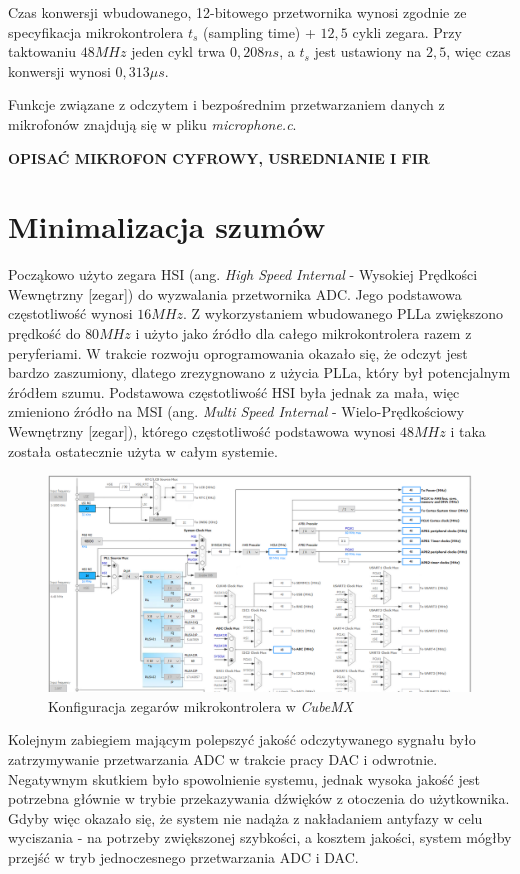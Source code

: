 Czas konwersji wbudowanego, 12-bitowego przetwornika wynosi zgodnie ze specyfikacja mikrokontrolera $t_s$ (sampling time) + $12,5$ cykli zegara\cite{STM32L4}. Przy taktowaniu $48MHz$ jeden cykl trwa $0,208ns$, a $t_s$ jest ustawiony na $2,5$, więc czas konwersji wynosi $0,313 \mu s$.

Funkcje związane z odczytem i bezpośrednim przetwarzaniem danych z mikrofonów znajdują się w pliku \textit{microphone.c}.

\textbf{OPISAĆ MIKROFON CYFROWY, USREDNIANIE I FIR}


\section{Minimalizacja szumów}
\label{cha:soft_noise}

Począkowo użyto zegara HSI (ang. \textit{High Speed Internal} - Wysokiej Prędkości Wewnętrzny [zegar]) do wyzwalania przetwornika ADC. Jego podstawowa częstotliwość wynosi $16MHz$. Z wykorzystaniem wbudowanego PLLa zwiększono prędkość do $80MHz$ i użyto jako źródło dla całego mikrokontrolera razem z peryferiami. W trakcie rozwoju oprogramowania okazało się, że odczyt jest bardzo zaszumiony, dlatego zrezygnowano z użycia PLLa, który był potencjalnym źródłem szumu. Podstawowa częstotliwość HSI była jednak za mała, więc zmieniono źródło na MSI (ang. \textit{Multi Speed Internal} - Wielo-Prędkościowy Wewnętrzny [zegar]), którego częstotliwość podstawowa wynosi $48MHz$ i taka została ostatecznie użyta w całym systemie.

\begin{figure}[H]
	\centering
	\includegraphics[scale=0.4]{zdjecia/clocks.png}
	\caption{\label{pic:clocks}Konfiguracja zegarów mikrokontrolera w \textit{CubeMX}}
\end{figure}

Kolejnym zabiegiem mającym polepszyć jakość odczytywanego sygnału było zatrzymywanie przetwarzania ADC w trakcie pracy DAC i odwrotnie. Negatywnym skutkiem było spowolnienie systemu, jednak wysoka jakość jest potrzebna głównie w trybie przekazywania dźwięków z otoczenia do użytkownika. Gdyby więc okazało się, że system nie nadąża z nakładaniem antyfazy w celu wyciszania - na potrzeby zwiększonej szybkości, a kosztem jakości, system mógłby przejść w tryb jednoczesnego przetwarzania ADC i DAC.

